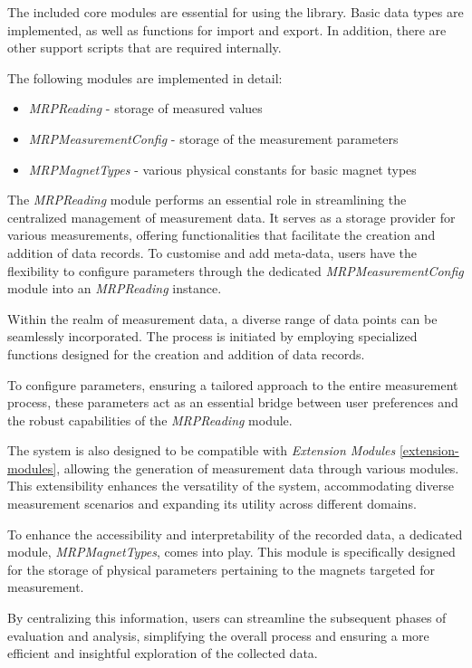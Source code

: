 The included core modules are essential for using the library. Basic
data types are implemented, as well as functions for import and export.
In addition, there are other support scripts that are required
internally.

The following modules are implemented in detail:

\begin{itemize}
\tightlist
\item
  \emph{MRPReading} - storage of measured values
\item
  \emph{MRPMeasurementConfig} - storage of the measurement parameters
\item
  \emph{MRPMagnetTypes} - various physical constants for basic magnet
  types
\end{itemize}

The \emph{MRPReading} module performs an essential role in streamlining
the centralized management of measurement data. It serves as a storage
provider for various measurements, offering functionalities that
facilitate the creation and addition of data records. To customise and
add meta-data, users have the flexibility to configure parameters
through the dedicated \emph{MRPMeasurementConfig} module into an
\emph{MRPReading} instance.

Within the realm of measurement data, a diverse range of data points can
be seamlessly incorporated. The process is initiated by employing
specialized functions designed for the creation and addition of data
records.

To configure parameters, ensuring a tailored approach to the entire
measurement process, these parameters act as an essential bridge between
user preferences and the robust capabilities of the \emph{MRPReading}
module.

The system is also designed to be compatible with \emph{Extension
Modules} \ref{extension-modules}, allowing the generation of measurement
data through various modules. This extensibility enhances the
versatility of the system, accommodating diverse measurement scenarios
and expanding its utility across different domains.

To enhance the accessibility and interpretability of the recorded data,
a dedicated module, \emph{MRPMagnetTypes}, comes into play. This module
is specifically designed for the storage of physical parameters
pertaining to the magnets targeted for measurement.

By centralizing this information, users can streamline the subsequent
phases of evaluation and analysis, simplifying the overall process and
ensuring a more efficient and insightful exploration of the collected
data.

